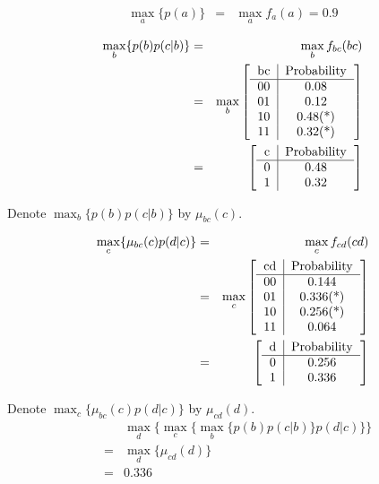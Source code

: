 \documentclass[11pt,a4paper]{article}
\begin{document}
\begin{eqnarray}
\max_{a} \{ p(a) \} &=& \max_{a}{f_a(a)} = 0.9 
\end{eqnarray}

\begin{eqnarray}
\max_{b} \{p(b)p(c|b) \} &=& 
\max_{b} f_{bc}(bc) \\
&=&\max_{b} \left[ 
\begin{tabular}{c|c}
bc & Probability \\
\hline
  00 &   0.08\\
  01 &   0.12\\
  10 &   0.48(*)\\
  11 &   0.32(*)\\
\end{tabular} \right] \\
&=& \left[ 
\begin{tabular}{c|c}
c & Probability \\
\hline
  0 &   0.48\\
  1 &   0.32\\
\end{tabular} \right]
\end{eqnarray}

Denote $\max_{b} \{p(b)p(c|b) \}$ by $\mu_{bc}(c)$. 

\begin{eqnarray}
	\max_{c} \{\mu_{bc}(c) p(d|c)\} &=& 
	\max_{c} f_{cd}(cd) \\
&=&\max_{c} \left[ 
\begin{tabular}{c|c}
cd & Probability \\
\hline
00 & 0.144 \\
01 & 0.336(*) \\
10 & 0.256(*) \\ 
11 & 0.064 \\
\end{tabular} \right] \\
&=&\left[ 
\begin{tabular}{c|c}
d & Probability \\
\hline
0 & 0.256 \\ 
1 & 0.336 
\end{tabular} \right]
\end{eqnarray}

Denote $\max_{c} \{\mu_{bc}(c) p(d|c)\}$ by $\mu_{cd}(d)$. 
\begin{eqnarray}
&& \max_{d} \{ \max_{c} \{\max_{b} \{p(b)p(c|b) \} p(d|c)\} \}  \\
&=& \max_{d}\{\mu_{cd}(d)\} \\
&=& 0.336 
\end{eqnarray}
\end{document}
